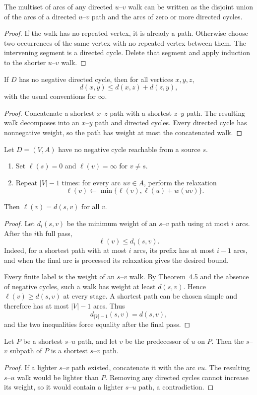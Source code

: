 \begin{notetheorem}
The multiset of arcs of any directed $u$--$v$ walk can be written as the disjoint union of the arcs of a directed $u$--$v$ path and the arcs of zero or more directed cycles.
\end{notetheorem}
\begin{proof}
If the walk has no repeated vertex, it is already a path.  Otherwise choose two occurrences of the same vertex with no repeated vertex between them.  The intervening segment is a directed cycle.  Delete that segment and apply induction to the shorter $u$--$v$ walk.
\end{proof}
\begin{notetheorem}
If $D$ has no negative directed cycle, then for all vertices $x,y,z$,
\[
  d(x,y)\le d(x,z)+d(z,y),
\]
with the usual conventions for $\infty$.
\end{notetheorem}
\begin{proof}
Concatenate a shortest $x$--$z$ path with a shortest $z$--$y$ path.  The resulting walk decomposes into an $x$--$y$ path and directed cycles.  Every directed cycle has nonnegative weight, so the path has weight at most the concatenated walk.
\end{proof}
\begin{notealgorithm}
Let $D=(V,A)$ have no negative cycle reachable from a source $s$.
\begin{enumerate}
  \item Set $\ell(s)=0$ and $\ell(v)=\infty$ for $v\ne s$.
  \item Repeat $|V|-1$ times: for every arc $uv\in A$, perform the relaxation
  \[
    \ell(v)\leftarrow\min\{\ell(v),\ell(u)+w(uv)\}.
  \]
\end{enumerate}
Then $\ell(v)=d(s,v)$ for all $v$.
\end{notealgorithm}
\begin{proof}
Let $d_i(s,v)$ be the minimum weight of an $s$--$v$ path using at most $i$ arcs.  After the $i$th full pass,
\[
  \ell(v)\le d_i(s,v).
\]
Indeed, for a shortest path with at most $i$ arcs, its prefix has at most $i-1$ arcs, and when the final arc is processed its relaxation gives the desired bound.

Every finite label is the weight of an $s$--$v$ walk.  By Theorem~4.5 and the absence of negative cycles, such a walk has weight at least $d(s,v)$.  Hence $\ell(v)\ge d(s,v)$ at every stage.  A shortest path can be chosen simple and therefore has at most $|V|-1$ arcs.  Thus
\[
  d_{|V|-1}(s,v)=d(s,v),
\]
and the two inequalities force equality after the final pass.
\end{proof}
\begin{notetheorem}
Let $P$ be a shortest $s$--$u$ path, and let $v$ be the predecessor of $u$ on $P$.  Then the $s$--$v$ subpath of $P$ is a shortest $s$--$v$ path.
\end{notetheorem}
\begin{proof}
If a lighter $s$--$v$ path existed, concatenate it with the arc $vu$.  The resulting $s$--$u$ walk would be lighter than $P$.  Removing any directed cycles cannot increase its weight, so it would contain a lighter $s$--$u$ path, a contradiction.
\end{proof}

